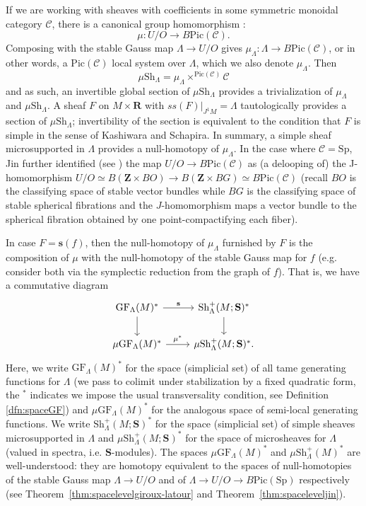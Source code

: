 \documentclass[12pt,a4paper]{article}
\numberwithin{equation}{section}
\theoremstyle{definition}
\theoremstyle{remark}
\newcommand{\Sp}{\mathrm{Sp}}
\newcommand{\Z}{\mathbf{Z}}
\newcommand{\CC}{\mathcal{C}}
\newcommand{\R}{\mathbf{R}}
\newcommand{\s}{\mathbf{s}}
\newcommand{\Sh}{\mathrm{Sh}}
\renewcommand{\S}{\mathbf{S}}
\newcommand{\GF}{\mathrm{GF}}
\newcommand{\Pic}{\mathrm{Pic}}
\begin{document}
If we are working with sheaves with coefficients in some symmetric monoidal category $\mathcal{C}$, there is a canonical group homomorphism \cite[Sec. 11]{Nadler-Shende}:
$$\mu: U/O \to B \Pic(\mathcal{C}).$$
Composing with the stable Gauss map $\Lambda \to U/O$ gives  $\mu_\Lambda: \Lambda \to B\Pic(\mathcal{C})$, or in other words, a $\Pic(\mathcal{C})$ local system over $\Lambda$, which we also denote $\mu_\Lambda$.
Then$$\mu \Sh_\Lambda = \mu_\Lambda \times^{\Pic(\mathcal{C})} \mathcal{C}$$
and as such, an invertible global section of $\mu \Sh_\Lambda$ provides a trivialization of $\mu_\Lambda$ and
$\mu \Sh_\Lambda$.  A sheaf $F$ on $M \times \R$ with $ss(F)|_{J^1 M} = \Lambda$ tautologically provides a section of $\mu \Sh_\Lambda$; invertibility of the section is equivalent to the condition that $F$ is simple in the sense of Kashiwara and Schapira.  In summary, a simple sheaf microsupported in $\Lambda$ provides a null-homotopy of $\mu_\Lambda$. In the case where $\CC=\Sp$, Jin further identified (see \cite{Jin}) the map $U/O\to B\Pic(\CC)$ as (a delooping of) the J-homomorphism
$U/O\simeq B(\Z\times BO)\to B(\Z\times BG)\simeq B\Pic(\CC)$ (recall $BO$ is the classifying space of stable vector bundles
while $BG$ is the classifying space of stable spherical fibrations and the $J$-homomorphism maps
a vector bundle to the spherical fibration obtained by one point-compactifying each fiber).

In case $F = \s(f)$, then the null-homotopy of $\mu_\Lambda$ furnished by $F$ is
the composition of $\mu$ with the null-homotopy of the stable Gauss map for $f$ (e.g. consider both via the symplectic reduction from the graph of $f$).
That is, we have a commutative diagram
\begin{equation}\label{eq:mainsquare}
\begin{tikzcd}
\GF_\Lambda(M)^* \arrow[r,"\s"] \arrow[d] & \Sh^+_\Lambda(M;\S)^* \arrow[d]\\
\mu\GF_\Lambda(M)^* \arrow[r,"\mu^*"] & \mu \Sh^+_\Lambda(M;\S)^*.
\end{tikzcd}
\end{equation}
Here, we write $\GF_{\Lambda}(M)^*$ for the space (simplicial set) of all tame generating functions for $\Lambda$ (we pass to colimit under stabilization by a fixed quadratic form, the ${}^*$ indicates we impose the usual transversality condition, see Definition \ref{dfn:spaceGF})
and $\mu\GF_\Lambda(M)^*$ for the analogous space of semi-local generating functions.
We write $\Sh^+_\Lambda(M;\S)^*$ for the space (simplicial set) of simple sheaves microsupported in $\Lambda$ and $\mu \Sh_\Lambda^+(M;\S)^*$ for the space
of microsheaves for $\Lambda$ (valued in spectra, i.e. $\S$-modules). The spaces $\mu\GF_\Lambda(M)^*$ and $\mu\Sh^+_\Lambda(M)^*$ are well-understood:
they are homotopy equivalent to the spaces of null-homotopies of the stable Gauss map $\Lambda \to U/O$ and of $\Lambda \to U/O \to B \Pic(\Sp)$ respectively
(see Theorem~\ref{thm:spacelevelgiroux-latour} and Theorem~\ref{thm:spaceleveljin}).
\end{document}
